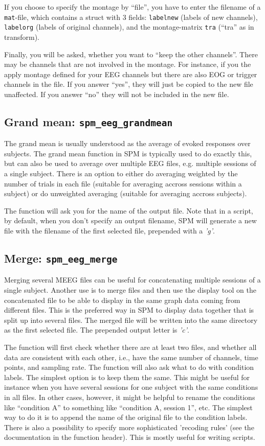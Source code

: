 If you choose to specify the montage by ``file'', you have to enter the filename of a \texttt{mat}-file, which contains a struct with 3 fields: \texttt{labelnew} (labels of new channels), \texttt{labelorg} (labels of original channels), and the montage-matrix \texttt{tra} (``tra'' as in transform).

Finally, you will be asked, whether you want to ``keep the other channels''. There may be channels that are not involved in the montage. For instance, if you the apply montage defined for your EEG channels but there are also EOG or trigger channels in the file. If you answer ``yes'', they will just be copied to the new file unaffected. If you answer ``no'' they will not be included in the new file.

\subsection{Grand mean: \texttt{spm\_eeg\_grandmean}}
The grand mean is usually understood as the average of evoked responses over subjects. The grand mean function in SPM is typically used to do exactly this, but can also be used to average over multiple EEG files, e.g. multiple sessions of a single subject. There is an option to either do averaging weighted by the number of trials in each file (suitable for averaging accross sessions within a subject) or do unweighted averaging (suitable for averaging accross subjects).

The function will ask you for the name of the output file. Note that in a script, by default, when you don't specify an output filename, SPM will generate a new file with the filename of the first selected file, prepended with a \textit{'g'}.

\subsection{Merge: \texttt{spm\_eeg\_merge}}
Merging several MEEG files can be useful for concatenating multiple sessions of a single subject. Another use is to merge files and then use the display tool on the concatenated file to be able to display in the same graph data coming from different files. This is the preferred way in SPM to display data together that is split up into several files. The merged file will be written into the same directory as the first selected file. The prepended output letter is \textit{'c'}.

The function will first check whether there are at least two files, and whether all data are consistent with each other, i.e., have the same number of channels, time points, and sampling rate. The function will also ask what to do with condition labels. The simplest option is to keep them the same. This might be useful for instance when you have several sessions for one subject with the same conditions in all files. In other cases, however, it might be helpful to rename the conditions like ``condition A'' to something like ``condition A, session 1'', etc. The simplest way to do it is to append the name of the original file to the condition labels. There is also a possibility to specify more sophisticated 'recoding rules' (see the documentation in the function header). This is mostly useful for writing scripts.

